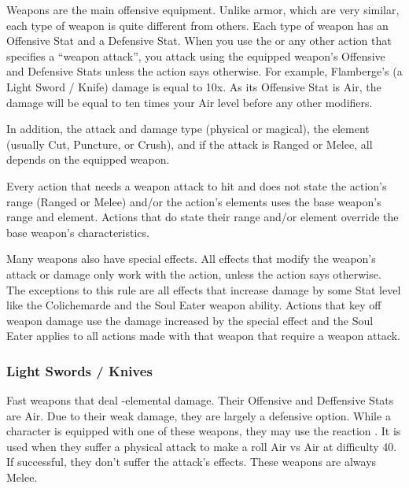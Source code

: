 \begin{multicols}{2}
Weapons are the main offensive equipment.  Unlike armor, which are very similar, each type of weapon is quite different from others.  Each type of weapon has an Offensive Stat and a Defensive Stat.  When you use the  or any other action that specifies a ``weapon attack'', you attack using the equipped weapon's Offensive and Defensive Stats unless the action says otherwise.  For example, Flamberge's (a Light Sword / Knife) damage is equal to 10x.  As its Offensive Stat is Air, the damage will be equal to ten times your Air level before any other modifiers.

In addition, the attack and damage type (physical or magical), the element (usually Cut, Puncture, or Crush), and if the attack is Ranged or Melee, all depends on the equipped weapon.

Every action that needs a weapon attack to hit and does not state the action's range (Ranged or Melee) and/or the action's elements uses the base weapon's range and element.  Actions that do state their range and/or element override the base weapon's characteristics.

Many weapons also have special effects.  All effects that modify the weapon's attack or damage only work with the  action, unless the action says otherwise.  The exceptions to this rule are all effects that increase damage by some Stat level like the Colichemarde and the Soul Eater weapon ability.  Actions that key off weapon damage use the damage increased by the special effect and the Soul Eater applies to all actions made with that weapon that require a weapon attack.
\end{multicols}
\begin{center}
\end{center}
\clearpage
\subsubsection{Light Swords / Knives}

Fast weapons that deal -elemental damage.  Their Offensive and Deffensive Stats are Air.  Due to their weak damage, they are largely a defensive option.  While a character is equipped with one of these weapons, they may use the reaction .  It is used when they suffer a physical attack to make a roll Air vs Air at difficulty 40.  If successful, they don't suffer the attack's effects.  These weapons are always Melee.


